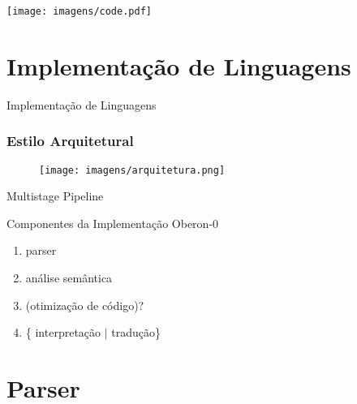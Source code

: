 \documentclass{beamer}
\begin{document}
\begin{frame}
    \texttt{[image: imagens/code.pdf]}
\end{frame} 

\section{Implementa\c c\~{a}o de Linguagens}

\begin{frame}
  \begin{center}
\huge{Implementa\c c\~{a}o de Linguagens \\ \pause  \faQuestionCircle}
\end{center}
\end{frame}

  \begin{frame}
  \frametitle{Estilo Arquitetural}

  \begin{figure}
    \texttt{[image: imagens/arquitetura.png]}
  \end{figure}
  \begin{center}
     {\color{blue}Multistage Pipeline} \citep{lip-book}
  \end{center}
  \pause
  
  \begin{block}{Componentes da Implementa\c c\~{a}o Oberon-0}
    \begin{enumerate}
     \item parser 
     \item an\'{a}lise sem\^{a}ntica
     \item (otimiza\c c\~{a}o de c\'{o}digo)?
     \item \{ interpreta\c c\~{a}o $\mid$ tradu\c c\~{a}o\}  
    \end{enumerate}
  \end{block}
\end{frame}

\section{Parser}
  
\end{document}
